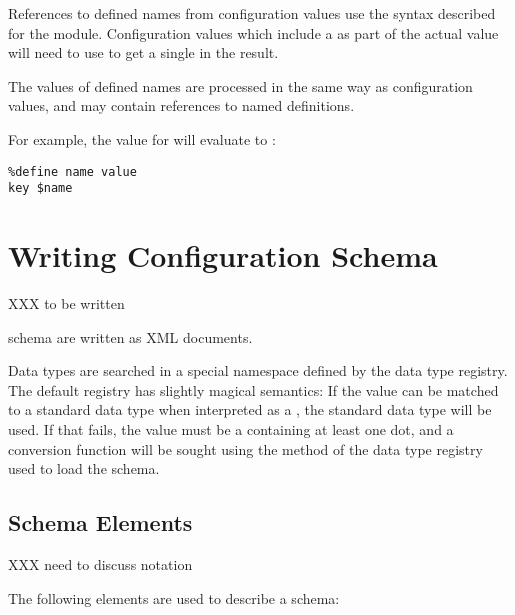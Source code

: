 \documentclass{howto}
\newcommand{\datatype}[1]{\strong{#1}}
\begin{document}
References to defined names from configuration values use the syntax
described for the  module.
Configuration values which include a \character{\$} as part of the
actual value will need to use \code{\$\$} to get a single
\character{\$} in the result.

The values of defined names are processed in the same way as
configuration values, and may contain references to named
definitions.

For example, the value for  will evaluate to :

\begin{verbatim}
%define name value
key $name
\end{verbatim} %


\section{Writing Configuration Schema \label{writing-schema}}

XXX to be written

 schema are written as XML documents.

Data types are searched in a special namespace defined by the data
type registry.  The default registry has slightly magical semantics:
If the value can be matched to a standard data type when interpreted
as a \datatype{basic-key}, the standard data type will be used.  If
that fails, the value must be a \datatype{dotted-name} containing at
least one dot, and a conversion function will be sought using the
 method of the data type registry used to load the
schema.


\subsection{Schema Elements \label{elements}}

XXX need to discuss notation

The following elements are used to describe a schema:
\end{document}
